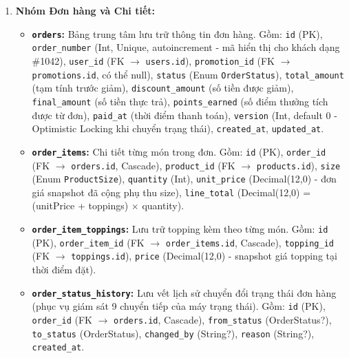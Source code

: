\documentclass[12pt,a4paper,oneside]{report}
\begin{document}
\begin{enumerate}
    \item \textbf{Nhóm Đơn hàng và Chi tiết:}
    \begin{itemize}
        \item \textbf{\texttt{orders}:} Bảng trung tâm lưu trữ thông tin đơn hàng. Gồm: \texttt{id} (PK), \texttt{order\_number} (Int, Unique, autoincrement - mã hiển thị cho khách dạng \#1042), \texttt{user\_id} (FK \(\to\) \texttt{users.id}), \texttt{promotion\_id} (FK \(\to\) \texttt{promotions.id}, có thể null), \texttt{status} (Enum \texttt{OrderStatus}), \texttt{total\_amount} (tạm tính trước giảm), \texttt{discount\_amount} (số tiền được giảm), \texttt{final\_amount} (số tiền thực trả), \texttt{points\_earned} (số điểm thưởng tích được từ đơn), \texttt{paid\_at} (thời điểm thanh toán), \texttt{version} (Int, default 0 - Optimistic Locking khi chuyển trạng thái), \texttt{created\_at}, \texttt{updated\_at}.
        \item \textbf{\texttt{order\_items}:} Chi tiết từng món trong đơn. Gồm: \texttt{id} (PK), \texttt{order\_id} (FK \(\to\) \texttt{orders.id}, Cascade), \texttt{product\_id} (FK \(\to\) \texttt{products.id}), \texttt{size} (Enum \texttt{ProductSize}), \texttt{quantity} (Int), \texttt{unit\_price} (Decimal(12,0) - đơn giá snapshot đã cộng phụ thu size), \texttt{line\_total} (Decimal(12,0) = (unitPrice + toppings) \(\times\) quantity).
        \item \textbf{\texttt{order\_item\_toppings}:} Lưu trữ topping kèm theo từng món. Gồm: \texttt{id} (PK), \texttt{order\_item\_id} (FK \(\to\) \texttt{order\_items.id}, Cascade), \texttt{topping\_id} (FK \(\to\) \texttt{toppings.id}), \texttt{price} (Decimal(12,0) - snapshot giá topping tại thời điểm đặt).
        \item \textbf{\texttt{order\_status\_history}:} Lưu vết lịch sử chuyển đổi trạng thái đơn hàng (phục vụ giám sát 9 chuyển tiếp của máy trạng thái). Gồm: \texttt{id} (PK), \texttt{order\_id} (FK \(\to\) \texttt{orders.id}, Cascade), \texttt{from\_status} (OrderStatus?), \texttt{to\_status} (OrderStatus), \texttt{changed\_by} (String?), \texttt{reason} (String?), \texttt{created\_at}.
    \end{itemize}


\end{enumerate}
\end{document}
